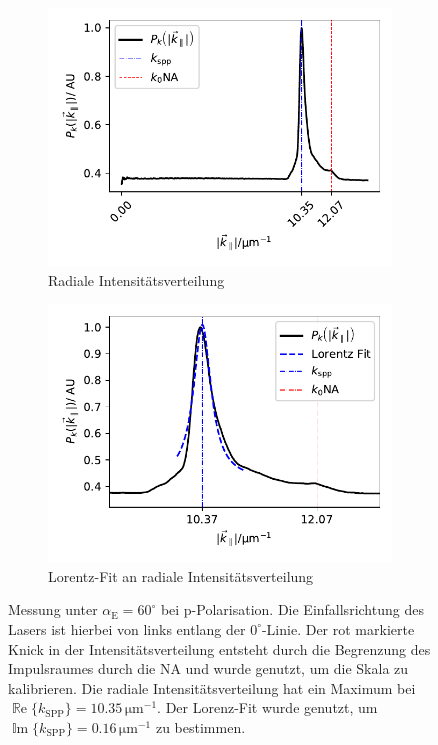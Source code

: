 \documentclass[a4paper, titlepage,  ngerman, fullpage]{book}
\renewcommand{\Re}{\operatorname{\mathbb{R}e}}
\renewcommand{\Im}{\operatorname{\mathbb{I}m}}
\begin{document}
\begin{figure}
\begin{subfigure}{0.5\textwidth}
				\includegraphics[width=\textwidth]{figures/new/4_1_radial_int.pdf}
				\caption{Radiale Intensitätsverteilung}
				\label{fig:radial_profile}			
			\end{subfigure}
			\hfill
			\begin{subfigure}{0.49\textwidth}
				\centering
				\includegraphics[width=\textwidth]{figures/new/4_1_lorenz_profile.pdf}
				\caption{Lorentz-Fit an radiale Intensitätsverteilung}
				\label{fig:lorenz_profile}			
			\end{subfigure}
	
		\caption[Messwerte bei linearer Polarisation]{Messung unter $\alpha_{\mathrm{E}} = 60^\circ$ bei p-Polarisation. Die Einfallsrichtung des Lasers ist hierbei von links entlang der $0^\circ$-Linie. Der rot markierte Knick in der Intensitätsverteilung entsteht durch die Begrenzung des Impulsraumes durch die NA und wurde genutzt, um die Skala zu kalibrieren. Die radiale Intensitätsverteilung  hat ein Maximum bei $\Re\{k_{\mathrm{SPP}}\}= 10.35\,\mathrm{\mu m ^{-1}}$. Der Lorenz-Fit  wurde genutzt, um $\Im\{k_{\mathrm{SPP}}\}= 0.16\,\mathrm{\mu m ^{-1}}$ zu bestimmen.}
		\label{fig:example_measure}			
	\end{figure}
\end{document}
